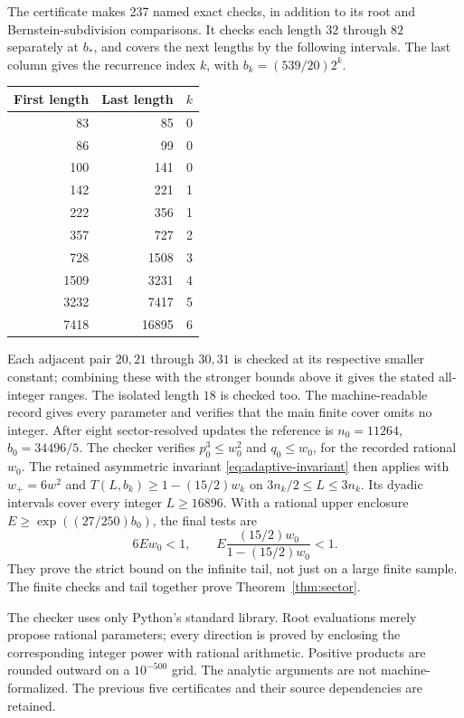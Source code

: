 \documentclass[11pt,a4paper]{article}
\begin{document}
The certificate makes 237 named exact checks, in addition to its root
and Bernstein-subdivision comparisons. It checks each length $32$ through
$82$ separately at $b_*$, and covers the next lengths by the following
intervals. The last column gives the recurrence index $k$, with
$b_k=(539/20)2^k$.
\begin{center}
\begin{tabular}{rrr}
\toprule First length & Last length & $k$\\ \midrule
83&85&0\\86&99&0\\100&141&0\\142&221&1\\222&356&1\\
357&727&2\\728&1508&3\\1509&3231&4\\3232&7417&5\\7418&16895&6\\
\bottomrule
\end{tabular}
\end{center}
Each adjacent pair $20,21$ through $30,31$ is checked at its respective
smaller constant; combining these with the stronger bounds above it gives
the stated all-integer ranges. The isolated length $18$ is checked too.
The machine-readable record gives every parameter and verifies that the
main finite cover omits no integer.
After eight sector-resolved updates the reference is
$n_0=11264$, $b_0=34496/5$. The checker verifies
$p_0^3\le w_0^2$ and $q_0\le w_0$, for the recorded rational $w_0$.
The retained asymmetric invariant \eqref{eq:adaptive-invariant} then
applies with $w_+=6w^2$ and
$T(L,b_k)\ge1-(15/2)w_k$ on $3n_k/2\le L\le3n_k$.
Its dyadic intervals cover every integer $L\ge16896$.
With a rational upper enclosure $E\ge\exp((27/250)b_0)$, the final tests are
\[
 6Ew_0<1,\qquad E\frac{(15/2)w_0}{1-(15/2)w_0}<1.
\]
They prove the strict bound on the infinite tail, not just on a
large finite sample. The finite checks and tail together prove
Theorem~\ref{thm:sector}.

The checker  uses only Python's
standard library. Root evaluations merely propose rational parameters;
every direction is proved by enclosing the corresponding integer
power with rational arithmetic. Positive products are rounded outward
on a $10^{-500}$ grid. The analytic arguments are not machine-formalized.
The previous five certificates and their source dependencies are retained.
\end{document}
